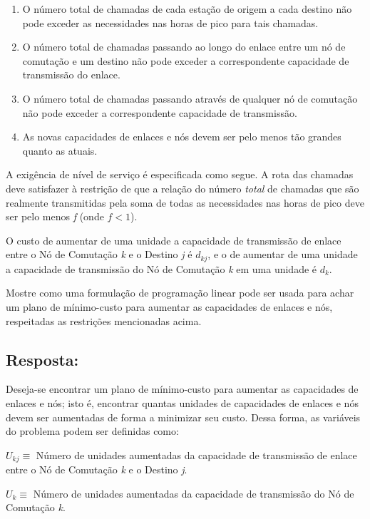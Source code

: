 \documentclass{article}
\begin{document}
   \begin{enumerate}[label=(\roman*)]
       \item O número total de chamadas de cada estação de origem a cada destino não pode exceder as necessidades nas horas de pico para tais chamadas.
       \item O número total de chamadas passando ao longo do enlace entre um nó de comutação e um destino não pode exceder a correspondente capacidade de transmissão do enlace.
       \item O número total de chamadas passando através de qualquer nó de comutação não pode exceder a correspondente capacidade de transmissão.
       \item As novas capacidades de enlaces e nós devem ser pelo menos tão grandes quanto as atuais.
   \end{enumerate}
   
  A exigência de nível de serviço é especificada como segue. A rota das chamadas deve satisfazer à restrição de que a relação do número \textit{total} de chamadas que são realmente transmitidas pela soma de todas as necessidades nas horas de pico deve ser pelo menos \textit{f} (onde \(f < 1\)).
  
  O custo de aumentar de uma unidade a capacidade de transmissão de enlace entre o Nó de Comutação \textit{k} e o Destino \textit{j} é \(d_{kj}\), e o de aumentar de uma unidade a capacidade de transmissão do Nó de Comutação \textit{k} em uma unidade é \(d_{k}\).
  
  Mostre como uma formulação de programação linear pode ser usada para achar um plano de mínimo-custo para aumentar as capacidades de enlaces e nós, respeitadas as restrições mencionadas acima.

\subsection{Resposta:}

    Deseja-se encontrar um plano de mínimo-custo para aumentar as capacidades de enlaces e nós; isto é, encontrar quantas unidades de capacidades de enlaces e nós devem ser aumentadas de forma a minimizar seu custo. Dessa forma, as variáveis do problema podem ser definidas como:

\(U_{kj} \equiv\) Número de unidades aumentadas da capacidade de transmissão de enlace entre o Nó de Comutação \textit{k} e o Destino \textit{j}.

\(U_{k} \equiv\) Número de unidades aumentadas da capacidade de transmissão do Nó de Comutação \textit{k}.
\end{document}
